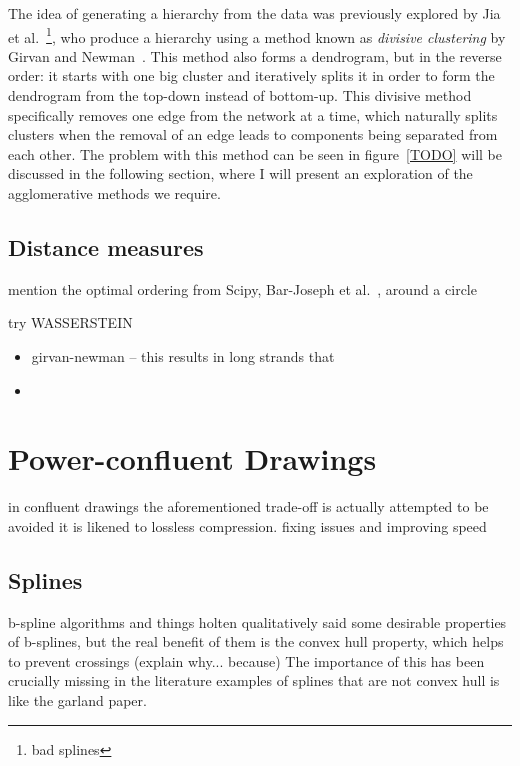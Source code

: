 
The idea of generating a hierarchy from the data was previously explored by Jia et al.~\cite{TODO}\footnote{bad splines}, who produce a hierarchy using a method known as \textit{divisive clustering} by Girvan and Newman~\cite{TODO}. This method also forms a dendrogram, but in the reverse order: it starts with one big cluster and iteratively splits it in order to form the dendrogram from the top-down instead of bottom-up. This divisive method specifically removes one edge from the network at a time, which naturally splits clusters when the removal of an edge leads to components being separated from each other. The problem with this method can be seen in figure~\ref{TODO} will be discussed in the following section, where I will present an exploration of the agglomerative methods we require. 

\subsection{Distance measures}

mention the optimal ordering from Scipy, Bar-Joseph et al.~\cite{TODO}, around a circle

try WASSERSTEIN

\begin{itemize}
    \item girvan-newman -- this results in long strands that \item
\end{itemize}

\section{Power-confluent Drawings}
in confluent drawings the aforementioned trade-off is actually attempted to be avoided
it is likened to lossless compression.
fixing issues and improving speed
\subsection{Splines}
b-spline algorithms and things
holten qualitatively said some desirable properties of b-splines, but the real benefit of them is the convex hull property, which helps to prevent crossings (explain why... because)
The importance of this has been crucially missing in the literature
examples of splines that are not convex hull is like the garland paper.
